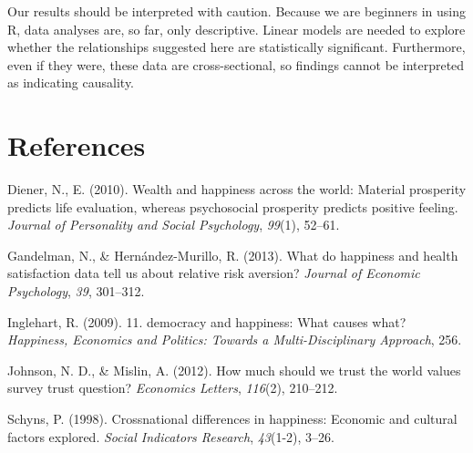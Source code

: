 \documentclass[man, fleqn, noextraspace,floatsintext]{apa6}
\begin{document}
Our results should be interpreted with caution. Because we are beginners
in using R, data analyses are, so far, only descriptive. Linear models
are needed to explore whether the relationships suggested here are
statistically significant. Furthermore, even if they were, these data
are cross-sectional, so findings cannot be interpreted as indicating
causality.

\newpage

\section{References}\label{references}

\begingroup
\setlength{\parindent}{-0.5in} \setlength{\leftskip}{0.5in}

\hypertarget{refs}{}
\hypertarget{ref-diener2010}{}
Diener, N., E. (2010). Wealth and happiness across the world: Material
prosperity predicts life evaluation, whereas psychosocial prosperity
predicts positive feeling. \emph{Journal of Personality and Social
Psychology}, \emph{99}(1), 52--61.

\hypertarget{ref-gandelman2013happiness}{}
Gandelman, N., \& Hernández-Murillo, R. (2013). What do happiness and
health satisfaction data tell us about relative risk aversion?
\emph{Journal of Economic Psychology}, \emph{39}, 301--312.

\hypertarget{ref-inglehart200911}{}
Inglehart, R. (2009). 11. democracy and happiness: What causes what?
\emph{Happiness, Economics and Politics: Towards a Multi-Disciplinary
Approach}, 256.

\hypertarget{ref-johnson2012much}{}
Johnson, N. D., \& Mislin, A. (2012). How much should we trust the world
values survey trust question? \emph{Economics Letters}, \emph{116}(2),
210--212.

\hypertarget{ref-schyns1998crossnational}{}
Schyns, P. (1998). Crossnational differences in happiness: Economic and
cultural factors explored. \emph{Social Indicators Research},
\emph{43}(1-2), 3--26.

\endgroup
\end{document}
